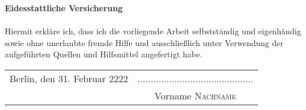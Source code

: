 \begin{titlepage}
\vspace*{5.0cm}
\large{\bf Eidesstattliche Versicherung}\\
\\
Hiermit erkl\"are ich, dass ich die vorliegende Arbeit selbstst\"andig und eigenh\"andig sowie ohne unerlaubte fremde Hilfe und ausschlie\ss lich unter Verwendung der aufgef\"uhrten Quellen und Hilfsmittel angefertigt habe.
\vspace*{1cm}
~\\
\begin{tabular}{lc}
      \vspace*{0.1cm}
      \noindent Berlin, den 31. Februar 2222 & \noindent ............................................ \\
      \vspace*{0.1cm}
					      & \noindent \large{Vorname \textsc{Nachname}}
\end{tabular}


\end{titlepage}
\sloppy

\titlepage
